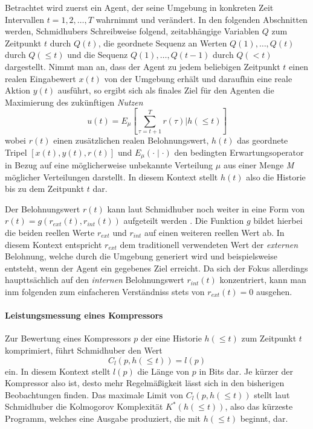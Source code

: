 Betrachtet wird zuerst ein Agent, der seine Umgebung in konkreten Zeit Intervallen \(t = 1,2, \dots ,T\) wahrnimmt und verändert. 
In den folgenden Abschnitten werden, Schmidhubers Schreibweise folgend, zeitabhängige Variablen \(Q\) zum Zeitpunkt \(t\) durch \(Q(t)\), die geordnete Sequenz an Werten \(Q(1), \dots,Q(t)\) durch \(Q(\leq t)\) und die Sequenz \(Q(1), \dots, Q(t-1)\) durch \(Q(<t)\) dargestellt.
Nimmt man an, dass der Agent zu jedem beliebigen Zeitpunkt \(t\) einen realen Eingabewert \(x(t)\) von der Umgebung erhält und daraufhin eine reale Aktion \(y(t)\) ausführt, so ergibt sich als finales Ziel für den Agenten die Maximierung des zukünftigen \emph{Nutzen} 
\begin{equation}
  u(t) = E_\mu \left[ \sum^T_{\tau=t+1} r(\tau) \bigl\lvert h(\leq t)\right]  
\end{equation}
wobei \(r(t)\) einen zusätzlichen realen Belohnungswert, \(h(t)\) das geordnete Tripel \(\left[ x(t),y(t),r(t)\right]\) und \(E_\mu(\cdot \mid \cdot)\) den bedingten Erwartungsoperator in Bezug auf eine möglicherweise unbekannte Verteilung \(\mu\) aus einer Menge \emph{M} möglicher Verteilungen darstellt. \cite[p.~17]{curiosity_schmidhuber}
In diesem Kontext stellt \(h(t)\) also die Historie bis zu dem Zeitpunkt \(t\) dar.

Der Belohnungswert \(r(t)\) kann laut Schmidhuber noch weiter in eine Form von \(r(t) = g(r_{ext}(t),r_{int}(t))\) aufgeteilt werden \cite{curiosity_schmidhuber}.
Die Funktion \(g\) bildet hierbei die beiden reellen Werte \(r_{ext}\) und \(r_{int}\) auf einen weiteren reellen Wert ab. In diesem Kontext entspricht \(r_{ext}\) dem traditionell verwendeten Wert der \emph{externen} Belohnung, welche durch die Umgebung generiert wird und beispielsweise entsteht, wenn der Agent ein gegebenes Ziel erreicht. 
Da sich der Fokus allerdings haupttsächlich auf den \emph{internen} Belohnungswert \(r_{int}(t)\) konzentriert, kann man inm folgenden zum einfacheren Verständniss stets von \(r_{ext}(t) = 0\) ausgehen.

\paragraph{Leistungsmessung eines Kompressors}
Zur Bewertung eines Kompressors \(p\) der eine Historie \(h(\leq t)\) zum Zeitpunkt \(t\) komprimiert, führt Schmidhuber den Wert 
\begin{equation}
  C_l(p,h(\leq t)) = l(p)  
\end{equation}
ein. In diesem Kontext stellt \(l(p)\) die Länge von \(p\) in Bits dar. Je kürzer der Kompressor also ist, desto mehr Regelmäßigkeit lässt sich in den bisherigen Beobachtungen finden. \cite[p.~19]{curiosity_schmidhuber}
Das maximale Limit von \(C_l(p,h(\leq t))\) stellt laut Schmidhuber die Kolmogorov Komplexität \(K^*(h(\leq t))\), also das kürzeste Programm, welches eine Ausgabe produziert, die mit \(h(\leq t)\) beginnt, dar.

